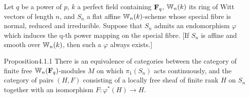 

Let $q$ be a power of $p$, $k$ a perfect field containing $\mathbf{F}_q$, $\mathbb{W}_n(k)$
its ring of Witt vectors of length $n$, and $S_n$ a flat affine $\mathbb{W}_n(k)$-scheme
whose special fibre is normal, reduced and irreducible. Suppose that $S_n$
admits an endomorphism $\varphi$ which induces the q-th power mapping on the
special fibre. [If $S_n$ is affine and smooth over $\mathbb{W}_n(k)$, then such a
$\varphi$ always exists.]

\begin{kathm}{Proposition}{4.1.1}
There is an equivalence of categories between the category of finite free
$\mathbb{W}_n(\mathbf{F}_q)$-modules $M$ on which $\pi_1(S_n)$ acts continuously, and the
category of pairs $(H,F)$ consisting of a locally free sheaf of finite rank
$H$ on $S_n$ together with an isomorphism $F\colon\varphi^*(H)\to H$.
\end{kathm}

